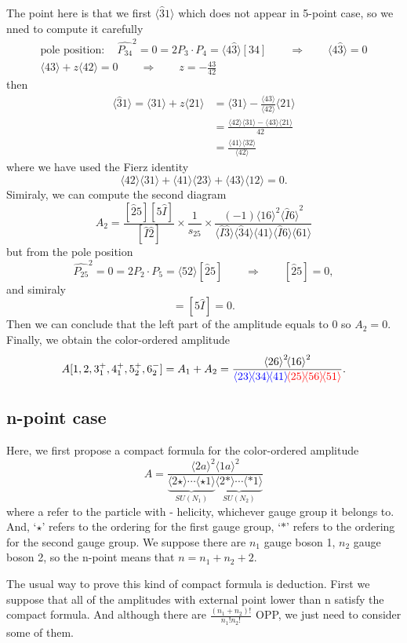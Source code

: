 \documentclass[12pt]{article}
\newcommand{\mdavg}[2]{\langle #1 \rangle\!\langle #2 \rangle}
\newcommand{\avg}[1]{\langle #1 \rangle}
\newcommand{\inavg}[2]{\langle #1 \rangle\! [#2]}
\newcommand{\asqu}[1]{{\langle#1\rangle}^2}
\begin{document}
The point here is that we first $\avg{\hat{3}1}$ which does not appear in 5-point case, so we nned to compute it carefully
\begin{gather*}
    \text{pole position}: \quad \hat{P_{34}}^2=0=2P_3\cdot P_4=\inavg{4\hat{3}}{34}\qquad\Rightarrow \qquad \avg{4\hat{3}}=0\\
    \avg{43}+z\avg{42}=0\qquad \Rightarrow \qquad z=-\frac{43}{42}
\end{gather*}
then
\begin{align*}
    \avg{\hat{3}1}=\avg{31}+z\avg{21}&=\avg{31}-\frac{\avg{43}}{\avg{42}}\avg{21}\\
    &=\frac{\mdavg{42}{31}-\mdavg{43}{21}}{42}\\
    &=\frac{\mdavg{41}{32}}{\avg{42}}
\end{align*}
where we have used the Fierz identity
\begin{equation*}
    \mdavg{42}{31}+\mdavg{41}{23}+\mdavg{43}{12}=0.
\end{equation*}
Simiraly, we can compute the second diagram
\begin{equation*}
    A_2=\frac{[\hat{2}5][5\hat{I}]}{[\hat{I}\hat{2}]}\times\frac{1}{s_{25}}\times \frac{(-1)\asqu{16}\asqu{\hat{I}6}}{\mdavg{\hat{I}\hat{3}}{\hat{3}4}
    \!\mdavg{41}{\hat{I}6}\!\avg{61}}
\end{equation*}
but from the pole position
\begin{equation*}
    \hat{P_{25}}^2=0=2P_2\cdot P_5=\inavg{52}{\hat{2}5}\qquad\Rightarrow \qquad [\hat{2}5]=0,
\end{equation*}
and simiraly
\begin{equation*}
    [\hat{2}\hat{I}]=[5\hat{I}]=0.
\end{equation*}
Then we can conclude that the left part of the amplitude equals to 0 so $A_2=0$. Finally, we obtain the color-ordered amplitude 
\begin{equation*}
    A[1,2,3_1^+,4_1^+,5_2^+,6_2^-]=A_1+A_2=\frac{\asqu{26}\!\asqu{16}}{\textcolor{blue}{\mdavg{23}{34}\!\avg{41}}\!\textcolor{red}{\mdavg{25}{56}\!\avg{51}}}.
\end{equation*}
\subsection{n-point case}
Here, we first propose a compact formula for the color-ordered amplitude
\begin{equation*}
    A=\frac{\asqu{2a}\!\asqu{1a}}{\underbrace{\avg{2\star}\cdots \avg{\star 1}}_{SU(N_1)}\underbrace{\avg{2\ast }\cdots \avg{\ast 1}}_{SU(N_2)}}
\end{equation*}
where a refer to the particle with - helicity, whichever gauge group it belongs to. And, `$\star$' refers to the ordering for the first gauge group, `$\ast$'
refers to the ordering for the second gauge group. We suppose there are $n_1$ gauge boson 1, $n_2$ gauge boson 2, so the n-point means that $n=n_1+n_2+2$.
\par
The usual way to prove this kind of compact formula is deduction. First we suppose that all of the amplitudes with external point lower than n satisfy the compact formula.
And although there are $\frac{(n_1+n_2)!}{n_1!n_2!}$ OPP, we just need to consider some of them. 
\end{document}
